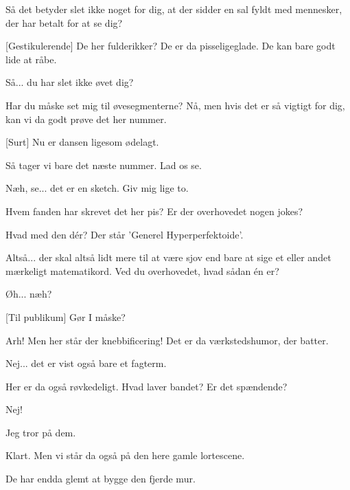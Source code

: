 \documentclass[a4paper,11pt]{article}
\begin{document}
\begin{sketch}
 Så det betyder slet ikke noget for dig, at der sidder en sal fyldt med mennesker, der har betalt for at se dig?

[Gestikulerende] De her fulderikker? De er da pisseligeglade. De kan bare godt lide at råbe.

 Så...  du har slet ikke øvet dig?

 Har du måske set mig til øvesegmenterne? Nå, men hvis det er så vigtigt for dig, kan vi da godt prøve det her nummer.

[Surt] Nu er dansen ligesom ødelagt.

 Så tager vi bare det næste nummer. Lad os se.


 Næh, se... det er en sketch. Giv mig lige to.


 Hvem fanden har skrevet det her pis? Er der overhovedet nogen jokes?


 Hvad med den dér? Der står 'Generel Hyperperfektoide'.

 Altså... der skal altså lidt mere til at være sjov end bare at sige et eller andet mærkeligt matematikord. Ved du overhovedet, hvad sådan én er?

 Øh... næh?

[Til publikum] Gør I måske?

 Arh! Men her står der knebbificering! Det er da værkstedshumor, der batter.

 Nej... det er vist også bare et fagterm.


 Her er da også røvkedeligt. Hvad laver bandet? Er det spændende?

 Nej!

 Jeg tror på dem.

 Klart. Men vi står da også på den here gamle lortescene.


 De har endda glemt at bygge den fjerde mur.



\end{sketch}
\end{document}
